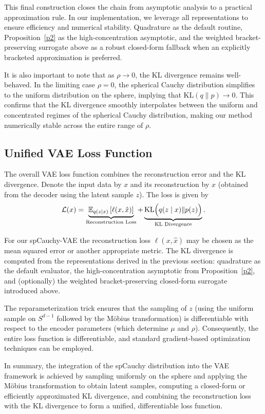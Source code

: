 \documentclass{article}
\begin{document}
This final construction closes the chain from asymptotic analysis to a practical approximation rule. In our implementation, we leverage all representations to ensure efficiency and numerical stability. Quadrature as the default routine, Proposition~\ref{p2} as the high-concentration asymptotic, and the weighted bracket-preserving surrogate above as a robust closed-form fallback when an explicitly bracketed approximation is preferred.

It is also important to note that as \(\rho \to 0\), the KL divergence remains well-behaved. In the limiting case \(\rho = 0\), the spherical Cauchy distribution simplifies to the uniform distribution on the sphere, implying that \(\mathrm{KL}(q\|p) \to 0\). This confirms that the KL divergence smoothly interpolates between the uniform and concentrated regimes of the spherical Cauchy distribution, making our method numerically stable across the entire range of \(\rho\).


\subsection{Unified VAE Loss Function}\label{combo}

The overall VAE loss function combines the reconstruction error and the KL divergence. Denote the input data by \( x \) and its reconstruction by \( \hat{x} \) (obtained from the decoder using the latent sample \( z \)). The loss is given by
\[
\mathcal{L}(x) = \underbrace{\mathbb{E}_{q(z \mid x)}\left[\ell(x, \hat{x})\right]}_{\text{Reconstruction Loss}} + \underbrace{\mathrm{KL}\Bigl(q(z \mid x)\|p(z)\Bigr)}_{\text{KL Divergence}}.
\]

For our spCauchy-VAE the reconstruction loss \(\ell(x, \hat{x})\) may be chosen as the mean squared error or another appropriate metric. The KL divergence is computed from the representations derived in the previous section: quadrature as the default evaluator, the high-concentration asymptotic from Proposition~\ref{p2}, and (optionally) the weighted bracket-preserving closed-form surrogate introduced above.

The reparameterization trick ensures that the sampling of \( z \) (using the uniform sample on \( S^{d-1} \) followed by the Möbius transformation) is differentiable with respect to the encoder parameters (which determine \(\mu\) and \(\rho\)). Consequently, the entire loss function is differentiable, and standard gradient-based optimization techniques can be employed.

In summary, the integration of the spCauchy distribution into the VAE framework is achieved by sampling uniformly on the sphere and applying the Möbius transformation to obtain latent samples, computing a closed-form or efficiently approximated KL divergence, and combining the reconstruction loss with the KL divergence to form a unified, differentiable loss function.
\end{document}
